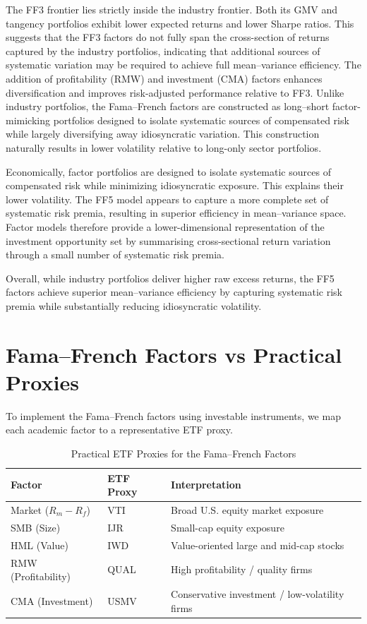 \documentclass[11pt]{exam}
\begin{document}
\noindent The FF3 frontier lies strictly inside the industry frontier. Both its GMV 
and tangency portfolios exhibit lower expected returns and lower Sharpe 
ratios. This suggests that the FF3 factors do not fully span the cross-section of returns captured by the industry portfolios, indicating that additional sources of systematic variation may be required to achieve full mean–variance efficiency.
The addition of profitability (RMW) and 
investment (CMA) factors enhances diversification and improves 
risk-adjusted performance relative to FF3.
Unlike industry portfolios, the Fama–French factors are constructed as long–short factor-mimicking portfolios designed to isolate systematic sources of compensated risk while largely diversifying away idiosyncratic variation. This construction naturally results in lower volatility relative to long-only sector portfolios.

\noindent Economically, factor portfolios are designed to isolate systematic sources 
of compensated risk while minimizing idiosyncratic exposure. This explains 
their lower volatility. The FF5 model appears to capture a more complete 
set of systematic risk premia, resulting in superior efficiency in 
mean–variance space.
Factor models therefore provide a lower-dimensional representation of the investment opportunity set by summarising cross-sectional return variation through a small number of systematic risk premia.

\noindent Overall, while industry portfolios deliver higher raw excess returns, the FF5 factors achieve superior mean–variance efficiency by capturing systematic risk premia while substantially reducing idiosyncratic volatility.

\newpage 
\section{Fama--French Factors vs Practical Proxies}
\label{sec:factor-v-proxies}
To implement the Fama–French factors using investable instruments, we map each academic factor to a representative ETF proxy.
\begin{table}[h]
\centering
\caption{Practical ETF Proxies for the Fama--French Factors}
\begin{tabular}{lll}
\toprule
Factor & ETF Proxy & Interpretation \\
\midrule
Market ($R_m - R_f$) & VTI & Broad U.S. equity market exposure \\
SMB (Size) & IJR & Small-cap equity exposure \\
HML (Value) & IWD & Value-oriented large and mid-cap stocks \\
RMW (Profitability) & QUAL & High profitability / quality firms \\
CMA (Investment) & USMV & Conservative investment / low-volatility firms \\
\bottomrule
\end{tabular}
\end{table}
\end{document}
